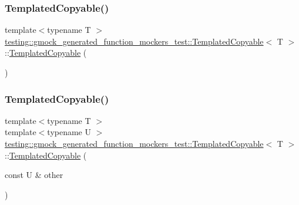 \subsubsection{\texorpdfstring{TemplatedCopyable()}{TemplatedCopyable()}\hspace{0.1cm}{\footnotesize\ttfamily [1/4]}}
{\footnotesize\ttfamily template$<$typename T $>$ \\
\mbox{\hyperlink{classtesting_1_1gmock__generated__function__mockers__test_1_1_templated_copyable}{testing\+::gmock\+\_\+generated\+\_\+function\+\_\+mockers\+\_\+test\+::\+Templated\+Copyable}}$<$ T $>$\+::\mbox{\hyperlink{classtesting_1_1gmock__generated__function__mockers__test_1_1_templated_copyable}{Templated\+Copyable}} (\begin{DoxyParamCaption}{ }\end{DoxyParamCaption})\hspace{0.3cm}{\ttfamily [inline]}}

\mbox{\label{classtesting_1_1gmock__generated__function__mockers__test_1_1_templated_copyable_aa2602f77d7f6bebfbc35c859637cd1f3}} 
\subsubsection{\texorpdfstring{TemplatedCopyable()}{TemplatedCopyable()}\hspace{0.1cm}{\footnotesize\ttfamily [2/4]}}
{\footnotesize\ttfamily template$<$typename T $>$ \\
template$<$typename U $>$ \\
\mbox{\hyperlink{classtesting_1_1gmock__generated__function__mockers__test_1_1_templated_copyable}{testing\+::gmock\+\_\+generated\+\_\+function\+\_\+mockers\+\_\+test\+::\+Templated\+Copyable}}$<$ T $>$\+::\mbox{\hyperlink{classtesting_1_1gmock__generated__function__mockers__test_1_1_templated_copyable}{Templated\+Copyable}} (\begin{DoxyParamCaption}\item[{const U \&}]{other }\end{DoxyParamCaption})\hspace{0.3cm}{\ttfamily [inline]}}

